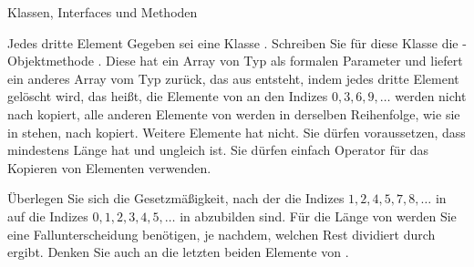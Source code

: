 \documentclass{../tuda-exercise}
\begin{document}
\begin{task}[credit=\stars{3}{3}]{Klassen, Interfaces und Methoden}
\begin{subtask}
      \begin{solution}
        
      \end{solution}
    \end{subtask}
  \end{task}

  \begin{task}[credit=\stars{3}{3}]{Jedes dritte Element}
    Gegeben sei eine Klasse . Schreiben Sie für diese Klasse die
    -Objektmethode . Diese hat ein Array  von
    Typ  als formalen Parameter und liefert ein anderes Array 
    vom Typ  zurück, das aus  entsteht, indem jedes dritte Element
    gelöscht wird, das heißt, die Elemente von  an den Indizes \(0, 3, 6, 9, \dots\)
    werden nicht nach  kopiert, alle anderen Elemente von  werden in
    derselben Reihenfolge, wie sie in  stehen, nach  kopiert. Weitere
    Elemente hat  nicht. Sie dürfen voraussetzen, dass  mindestens
    Länge  hat und ungleich  ist. Sie dürfen einfach Operator
    \inlinejava{=} für das Kopieren von Elementen verwenden.

    \br

    \begin{note}[title=Hinweis:, color=tuda-orange]
      Überlegen Sie sich die Gesetzmäßigkeit, nach der die Indizes \(1, 2, 4, 5, 7, 8, \dots\) in
       auf die Indizes \(0, 1, 2, 3, 4, 5, \dots\) in  abzubilden
      sind. Für die Länge von  werden Sie eine Fallunterscheidung benötigen, je
      nachdem, welchen Rest  dividiert durch  ergibt. Denken
      Sie auch an die letzten beiden Elemente von .
    \end{note}

    \begin{solution}
      
    \end{solution}
  \end{task}
\end{document}
